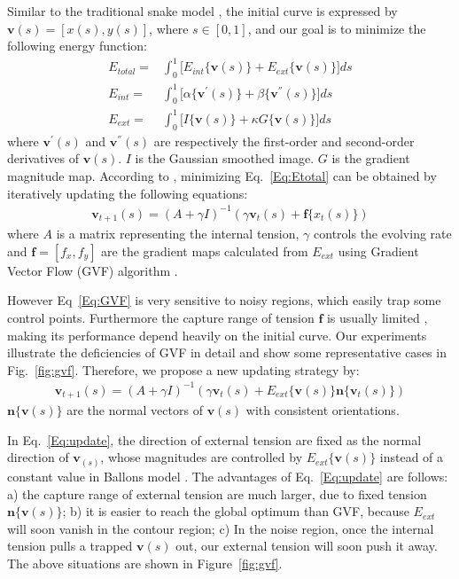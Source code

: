 Similar to the traditional snake model \cite{Kass1988}, the initial curve is expressed by $\mathbf{v}(s)=[x(s),y(s)]$, where $s\in[0,1]$, and our goal is to minimize the following energy function:
\begin{eqnarray}\label{Eq:Etotal}
E_{total} =& \int_{0}^{1}\big[E_{int}\{\mathbf{v}(s)\}+E_{ext}\{\mathbf{v}(s)\}\big]ds\nonumber \\
E_{int} =& \int_{0}^{1}\big [\alpha\{\mathbf{v}^{'}(s)\}+\beta\{\mathbf{v}^{''}(s)\}\big]ds \\
E_{ext} =& \int_{0}^{1}\big[I\{\mathbf{v}(s)\} + \kappa G\{\mathbf{v}(s)\}\big]ds\nonumber
\end{eqnarray}
where $\mathbf{v}^{'}(s)$ and $\mathbf{v}^{''}(s)$ are respectively the first-order and second-order derivatives of $\mathbf{v}(s)$.
$I$ is the Gaussian smoothed image.
$G$ is the gradient magnitude map.
According to \cite{Kass1988}, minimizing Eq.~\ref{Eq:Etotal} can be obtained by iteratively updating the following equations:
\begin{eqnarray}\label{Eq:GVF}
\mathbf{v}_{t+1}(s) = (A+\gamma I)^{-1}(\gamma \mathbf{v}_t(s)+\mathbf{f}\{x_t(s)\})
\end{eqnarray}
where $A$ is a matrix representing the internal tension, $\gamma$ controls the evolving rate and $\mathbf{f}=[f_{x},f_{y}]$ are the gradient maps calculated from $E_{ext}$ using Gradient Vector Flow (GVF) algorithm \cite{Xu1998}.

However Eq~\ref{Eq:GVF} is very sensitive to noisy regions, which easily trap some control points. 
Furthermore the capture range of tension $\mathbf{f}$ is usually limited \cite{Cohen1991}, making its performance depend heavily on the initial curve.
Our experiments illustrate the deficiencies of GVF in detail and show some representative cases in Fig.~\ref{fig:gvf}.
Therefore, we propose a new updating strategy by:
\begin{eqnarray}\label{Eq:update}
\mathbf{v}_{t+1}(s) = (A+\gamma I)^{-1}(\gamma \mathbf{v}_t(s)+E_{ext}\{\mathbf{v}(s)\}\mathbf{n}\{\mathbf{v}_t(s)\})
\end{eqnarray}
$\mathbf{n}\{\mathbf{v}(s)\}$ are the normal vectors of $\mathbf{v}(s)$ with consistent orientations.

In Eq.~\ref{Eq:update}, the direction of external tension are fixed as the normal direction of $\mathbf{v}_(s)$, whose magnitudes are controlled by $E_{ext}\{\mathbf{v}(s)\}$ instead of a constant value in Ballons model \cite{Cohen1991}.
The advantages of Eq.~\ref{Eq:update} are follows:
a) the capture range of external tension are much larger, due to fixed tension $\mathbf{n}\{\mathbf{v}(s)\}$;
b) it is easier to reach the global optimum than GVF, because $E_{ext}$ will soon vanish in the contour region;
c) In the noise region, once the internal tension pulls a trapped $\mathbf{v}(s)$ out, our external tension will soon push it away.
The above situations are shown in Figure~\ref{fig:gvf}.

